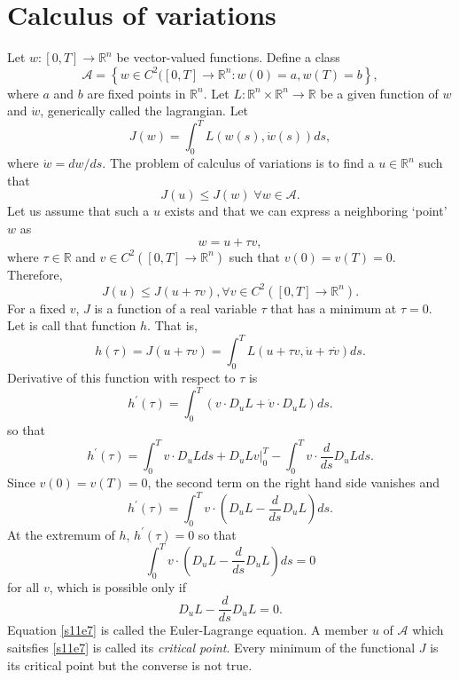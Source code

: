 \documentclass{article}
\theoremstyle{plain}
\numberwithin{thm}{section}
\theoremstyle{plain}
\numberwithin{prop}{section}
\theoremstyle{definition}
\numberwithin{defn}{section}
\theoremstyle{remark}
\numberwithin{equation}{section}
\begin{document}
\section{Calculus of variations}\label{s11}
Let $w: [0, T] \rightarrow \mathbb{R}^n$ be vector-valued functions. Define a class
\begin{equation}\label{s11e1}
\mathcal{A} = \left\{w \in C^2([0, T] \rightarrow \mathbb{R}^n : w(0) = a, w(T) = b\right\},
\end{equation}
where $a$ and $b$ are fixed points in $\mathbb{R}^n$. Let $L: \mathbb{R}^n \times \mathbb{R}^n 
\rightarrow \mathbb{R}$ be a given function of $w$ and $\dot{w}$, generically called the lagrangian.
Let
\begin{equation}\label{s11e2}
J(w) = \int_0^T L(w(s), \dot{w}(s))ds,
\end{equation}
where $\dot{w} = dw/ds$. The problem of calculus of variations is to find a $u \in 
\mathbb{R}^n$ such that
\begin{equation}\label{s11e3}
J(u) \le J(w) \;\forall w \in \mathcal{A}.
\end{equation}
Let us assume that such a $u$ exists and that we can express a neighboring `point' $w$ as
\begin{equation}\label{s11e4}
w = u + \tau v,
\end{equation}
where $\tau \in \mathbb{R}$ and $v \in C^2([0, T] \rightarrow \mathbb{R}^n)$ such that $v(0) = v(T)
= 0$. Therefore,
\begin{equation}\label{s11e5}
J(u) \le J(u + \tau v), \forall v \in C^2([0, T] \rightarrow \mathbb{R}^n).
\end{equation}
For a fixed $v$, $J$ is a function of a real variable $\tau$ that has a minimum at $\tau = 0$. Let
is call that function $h$. That is,
\begin{equation}\label{s11e6}
h(\tau) = J(u + \tau v) = \int_0^T L(u + \tau v, \dot{u} + \tau\dot{v})ds.
\end{equation}
Derivative of this function with respect to $\tau$ is
\[
h^\prime(\tau) = \int_0^T(v\cdot D_u L + \dot{v}\cdot D_{\dot{u}}L)ds.
\]
so that
\[
h^\prime(\tau) = 
\int_0^T v\cdot D_uL ds + D_{\dot{u}}L v\Big|_0^T - \int_0^T v\cdot \frac{d}{ds}D_{\dot{u}}Lds.
\]
Since $v(0) = v(T) = 0$, the second term on the right hand side vanishes and 
\[
h^\prime(\tau) = \int_0^Tv\cdot\left(D_uL - \frac{d}{ds}D_{\dot{u}}L\right)ds.
\]
At the extremum of $h$, $h^\prime(\tau) = 0$ so that
\[
\int_0^Tv\cdot\left(D_uL - \frac{d}{ds}D_{\dot{u}}L\right)ds = 0
\]
for all $v$, which is possible only if 
\begin{equation}\label{s11e7}
D_uL - \frac{d}{ds}D_{\dot{u}}L = 0.
\end{equation}
Equation \eqref{s11e7} is called the Euler-Lagrange equation. A member $u$ of $\mathcal{A}$ which
saitsfies \eqref{s11e7} is called its \emph{critical point}. Every minimum of the functional $J$ is
its critical point but the converse is not true.
\end{document}
